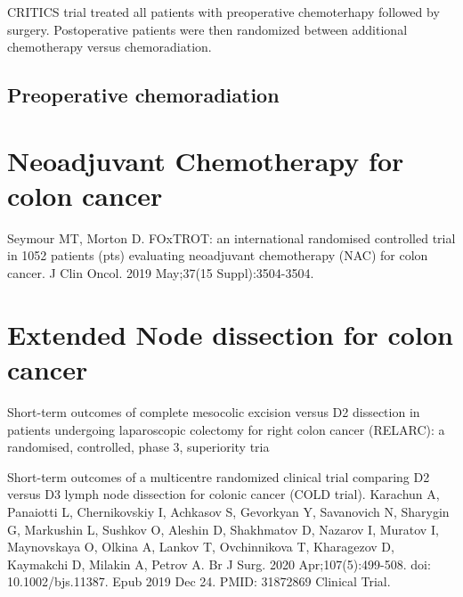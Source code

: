 \documentclass[
]{book}
\begin{document}
CRITICS trial treated all patients with preoperative chemoterhapy followed by surgery. Postoperative patients were then randomized between additional chemotherapy versus chemoradiation.

\hypertarget{preoperative-chemoradiation}{%
\section{Preoperative chemoradiation}\label{preoperative-chemoradiation}}

\citep{ajani3953}

\hypertarget{neoadjuvant-chemotherapy-for-colon-cancer}{%
\chapter{Neoadjuvant Chemotherapy for colon cancer}\label{neoadjuvant-chemotherapy-for-colon-cancer}}

Seymour MT, Morton D. FOxTROT: an international randomised controlled trial in 1052 patients (pts) evaluating neoadjuvant chemotherapy (NAC) for colon cancer. J Clin Oncol. 2019 May;37(15 Suppl):3504-3504.

\hypertarget{extended-node-dissection-for-colon-cancer}{%
\chapter{Extended Node dissection for colon cancer}\label{extended-node-dissection-for-colon-cancer}}

Short-term outcomes of complete mesocolic excision versus D2 dissection in patients undergoing laparoscopic colectomy for right colon cancer (RELARC): a randomised, controlled, phase 3, superiority tria

Short-term outcomes of a multicentre randomized clinical trial comparing D2 versus D3 lymph node dissection for colonic cancer (COLD trial).
Karachun A, Panaiotti L, Chernikovskiy I, Achkasov S, Gevorkyan Y, Savanovich N, Sharygin G, Markushin L, Sushkov O, Aleshin D, Shakhmatov D, Nazarov I, Muratov I, Maynovskaya O, Olkina A, Lankov T, Ovchinnikova T, Kharagezov D, Kaymakchi D, Milakin A, Petrov A.
Br J Surg. 2020 Apr;107(5):499-508. doi: 10.1002/bjs.11387. Epub 2019 Dec 24.
PMID: 31872869 Clinical Trial.

  
\end{document}
